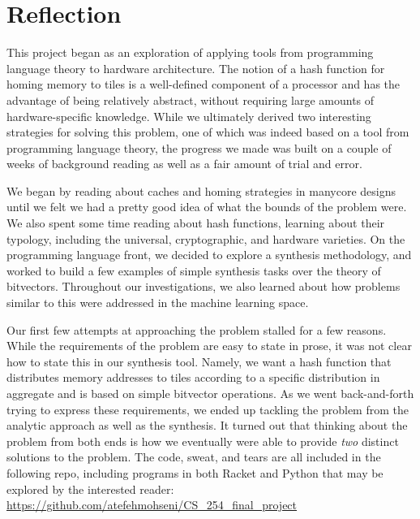 
\section{Reflection}
\label{sec:Reflection}

This project began as an exploration of applying tools from programming language
theory to hardware architecture.  The notion of a hash function for homing
memory to tiles is a well-defined component of a processor and has the advantage
of being relatively abstract, without requiring large amounts of
hardware-specific knowledge.  While we ultimately derived two interesting
strategies for solving this problem, one of which was indeed based on a tool
from programming language theory, the progress we made was built on a couple of
weeks of background reading as well as a fair amount of trial and error.

We began by reading about caches and homing strategies in manycore designs until
we felt we had a pretty good idea of what the bounds of the problem were.  We
also spent some time reading about hash functions, learning about their
typology, including the universal, cryptographic, and hardware varieties.  On
the programming language front, we decided to explore a synthesis methodology,
and worked to build a few examples of simple synthesis tasks over the theory of
bitvectors.  Throughout our investigations, we also learned about how problems
similar to this were addressed in the machine learning space.

Our first few attempts at approaching the problem stalled for a few reasons.
While the requirements of the problem are easy to state in prose, it was not
clear how to state this in our synthesis tool.  Namely, we want a hash function
that distributes memory addresses to tiles according to a specific distribution
in aggregate and is based on simple bitvector operations.  As we went
back-and-forth trying to express these requirements, we ended up tackling the
problem from the analytic approach as well as the synthesis.  It turned out that
thinking about the problem from both ends is how we eventually were able to
provide \textit{two} distinct solutions to the problem.  The code, sweat, and tears are
all included in the following repo, including programs in both Racket and
Python that may be explored by the interested reader: \url{https://github.com/atefehmohseni/CS_254_final_project}


